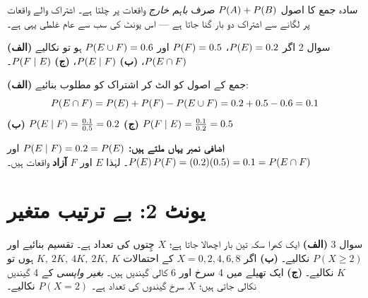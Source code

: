 \begin{ghalti}
سادہ جمع کا اصول \(P\!\left(A\right)+P\!\left(B\right)\) صرف \emph{باہم خارج} واقعات پر چلتا ہے۔
اشتراک والے واقعات پر لگانے سے اشتراک دو بار گنا جاتا ہے --- اس یونٹ کی سب سے
عام غلطی یہی ہے۔
\end{ghalti}

\begin{sawal}{سوال \textenglish{2}}
اگر \(P\!\left(E\right)=0.2\)، \(P\!\left(F\right)=0.5\) اور \(P\!\left(E\cup F\right)=0.6\) ہو تو نکالیے
\textbf{(الف)} \(P\!\left(E\cap F\right)\)، \textbf{(ب)} \(P\!\left(E\mid F\right)\)،
\textbf{(ج)} \(P\!\left(F\mid E\right)\)۔
\end{sawal}

\begin{hal}
\textbf{(الف)} جمع کے اصول کو الٹ کر اشتراک کو مطلوب بنائیے:
\[
P\!\left(E\cap F\right)=P\!\left(E\right)+P\!\left(F\right)-P\!\left(E\cup F\right)=0.2+0.5-0.6=0.1
\]
\textbf{(ب)} \(P\!\left(E\mid F\right)=\tfrac{0.1}{0.5}=0.2\) \qquad
\textbf{(ج)} \(P\!\left(F\mid E\right)=\tfrac{0.1}{0.2}=0.5\)

\medskip
\textbf{اضافی نمبر یہاں ملتے ہیں:} \(P\!\left(E\mid F\right)=0.2=P\!\left(E\right)\) اور
\(P\!\left(E\right)P\!\left(F\right)=(0.2)(0.5)=0.1=P\!\left(E\cap F\right)\)۔ لہٰذا \(E\) اور \(F\)
\textbf{آزاد} واقعات ہیں۔

\end{hal}

\section*{یونٹ \textenglish{2}: بے ترتیب متغیر}

\begin{sawal}{سوال \textenglish{3}}
\textbf{(الف)} ایک کھرا سکہ تین بار اچھالا جاتا ہے؛ \(X\) چِتوں کی تعداد ہے۔
تقسیم بنائیے اور \(P(X\ge 2)\) نکالیے۔
\textbf{(ب)} اگر \(X=0,2,4,6,8\) کے احتمالات \(K,\ 2K,\ 4K,\ 2K,\ K\) ہوں تو
\(K\) نکالیے۔
\textbf{(ج)} ایک تھیلے میں \textenglish{4} سرخ اور \textenglish{6} کالی گیندیں
ہیں۔ \emph{بغیر واپسی} کے \textenglish{4} گیندیں نکالی جاتی ہیں؛ \(X\) سرخ
گیندوں کی تعداد ہے۔ \(P(X=2)\) نکالیے۔
\end{sawal}

